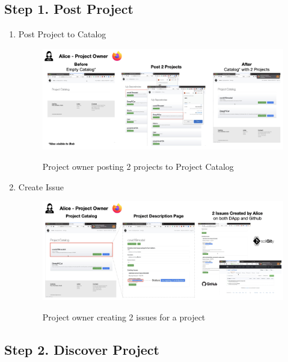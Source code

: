 \documentclass[12pt]{article}
\renewcommand{\_}{\kern-1.5pt\textunderscore\kern-1.5pt}
\begin{document}
\subsection*{Step 1. Post Project}
 \begin{enumerate}
    \item Post Project to Catalog
         \begin{figure}[H]
        	\centering
            \includegraphics[width=16.5cm]{graphs/50. post_1.png}\\
        	\caption{Project owner posting 2 projects to Project Catalog}
        	\label{fig:post1}
        \end{figure}

    \item Create Issue
    
         \begin{figure}[H]
        	\centering
            \includegraphics[width=16.5cm]{graphs/51. post_2.png}\\
        	\caption{Project owner creating 2 issues for a project}
        	\label{fig:post2}
        \end{figure}

 \end{enumerate}


\subsection*{Step 2. Discover Project}
\end{document}
